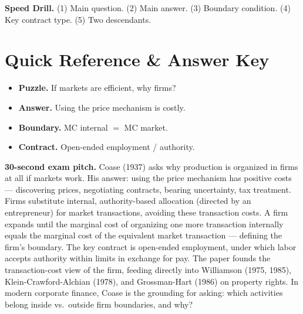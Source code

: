 \documentclass[11pt]{article}
\begin{document}
\vspace{6pt}
\begin{drillbox}
\textbf{Speed Drill.} (1) Main question. (2) Main answer. (3) Boundary condition. (4) Key contract type. (5) Two descendants.
\end{drillbox}

\section*{Quick Reference \& Answer Key}
\begin{answerbox}
\begin{itemize}
\item \textbf{Puzzle.} If markets are efficient, why firms?
\item \textbf{Answer.} Using the price mechanism is costly.
\item \textbf{Boundary.} MC internal $=$ MC market.
\item \textbf{Contract.} Open-ended employment / authority.
\end{itemize}
\end{answerbox}

\begin{keybox}
\textbf{30-second exam pitch.} Coase (1937) asks why production is organized in firms at all if markets work. His answer: using the price mechanism has positive costs --- discovering prices, negotiating contracts, bearing uncertainty, tax treatment. Firms substitute internal, authority-based allocation (directed by an entrepreneur) for market transactions, avoiding these transaction costs. A firm expands until the marginal cost of organizing one more transaction internally equals the marginal cost of the equivalent market transaction --- defining the firm's boundary. The key contract is open-ended employment, under which labor accepts authority within limits in exchange for pay. The paper founds the transaction-cost view of the firm, feeding directly into Williamson (1975, 1985), Klein-Crawford-Alchian (1978), and Grossman-Hart (1986) on property rights. In modern corporate finance, Coase is the grounding for asking: which activities belong inside vs.\ outside firm boundaries, and why?
\end{keybox}
\end{document}
